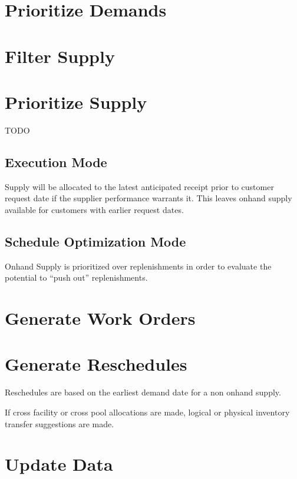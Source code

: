 \documentclass[letterpaper,10pt,english]{sphinxmanual}
\begin{document}
\section{Prioritize Demands}
\label{APS/ApsTechnical:prioritize-demands}

\section{Filter Supply}
\label{APS/ApsTechnical:filter-supply}

\section{Prioritize Supply}
\label{APS/ApsTechnical:prioritize-supply}
TODO


\subsection{Execution Mode}
\label{APS/ApsTechnical:execution-mode}
Supply will be allocated to the latest anticipated receipt prior
to customer request date if the supplier performance warrants it.
This leaves onhand supply available for customers with earlier request dates.


\subsection{Schedule Optimization Mode}
\label{APS/ApsTechnical:schedule-optimization-mode}
Onhand Supply is prioritized over replenishments in order to evaluate
the potential to ``push out'' replenishments.


\section{Generate Work Orders}
\label{APS/ApsTechnical:generate-work-orders}

\section{Generate Reschedules}
\label{APS/ApsTechnical:generate-reschedules}
Reschedules are based on the earliest demand date for a non onhand supply.

If cross facility or cross pool allocations are made, logical or physical
inventory transfer suggestions are made.


\section{Update Data}
\label{APS/ApsTechnical:update-data}
\end{document}
